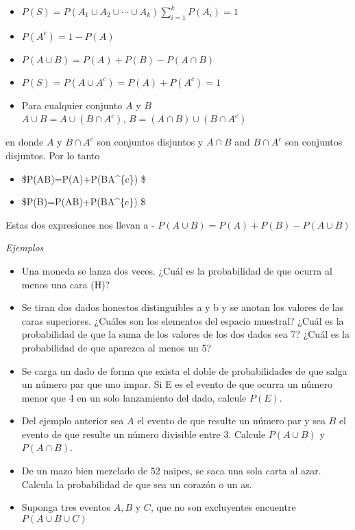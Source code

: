 \documentclass[11pt]{article}
\providecommand{\tightlist}{%
      \setlength{\itemsep}{0pt}\setlength{\parskip}{0pt}}
\begin{document}
\begin{itemize}
\item
  \(P(S) = P(A_{1}\cup A_{2} \cup \cdots \cup A_{k}) \displaystyle \sum_{i=1}^{k}{P(A_{i})}=1\)
\item
  \(P(A^{c})=1-P(A)\)
\item
  \(P(A\cup B)= P(A)+P(B)-P(A\cap B)\)
\item
  \(P(S)=P(A \cup A^{c})= P(A)+P(A^{c})=1\)
\item
  Para cualquier conjunto \(A\) y \(B\)\\
  \(A\cup B= A\cup (B\cap A^{c})\), \(B=(A\cap B)\cup (B\cap A^{c})\)
\end{itemize}

en donde \(A\) y \(B \cap A^{c}\) son conjuntos disjuntos y \(A\cap B\)
and \(B\cap A^{c}\) son conjuntos disjuntos. Por lo tanto

\begin{itemize}
\tightlist
\item
  \$P(A\cup B)=P(A)+P(B\cap A\^{}\{c\}) \$
\item
  \$P(B)=P(A\cup B)+P(B\cap A\^{}\{c\}) \$
\end{itemize}

Estas dos expresiones nos llevan a - \(P(A\cup B)=P(A)+P(B)-P(A\cup B)\)

\emph{Ejemplos}

\begin{itemize}
\item
  Una moneda se lanza dos veces. ¿Cuál es la probabilidad de que ocurra
  al menos una cara (H)?
\item
  Se tiran dos dados honestos distinguibles a y b y se anotan los
  valores de las caras superiores. ¿Cuáles son los elementos del espacio
  muestral? ¿Cuál es la probabilidad de que la suma de los valores de
  los dos dados sea 7? ¿Cuál es la probabilidad de que aparezca al menos
  un 5?
\item
  Se carga un dado de forma que exista el doble de probabilidades de que
  salga un número par que uno impar. Si E es el evento de que ocurra un
  número menor que 4 en un solo lanzamiento del dado, calcule \(P(E)\).
\item
  Del ejemplo anterior sea \(A\) el evento de que resulte un número par
  y sea \(B\) el evento de que resulte un número divisible entre 3.
  Calcule \(P(A \cup B)\) y \(P(A \cap B)\).
\item
  De un mazo bien mezclado de 52 naipes, se saca una sola carta al azar.
  Calcula la probabilidad de que sea un corazón o un as.
\item
  Suponga tres eventos \(A, B\) y \(C\), que no son excluyentes
  encuentre \(P(A \cup B \cup C)\)
\end{itemize}
\end{document}
